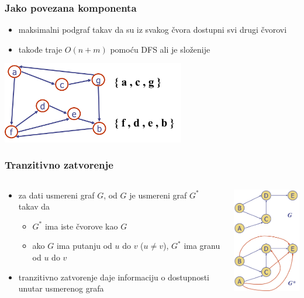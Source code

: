 \documentclass[compress,aspectratio=169]{beamer}
\begin{document}
\begin{frame}[fragile]
  \frametitle{Jako povezana komponenta}
  \begin{itemize}
    \item maksimalni podgraf takav da su iz svakog čvora dostupni svi
      drugi čvorovi
    \item takođe traje $O(n+m)$ pomoću DFS ali je složenije
  \end{itemize}
  \begin{center}
    \includegraphics[width=8cm]{asp-14-pic34.png}
  \end{center}
\end{frame}

\begin{frame}[fragile]
  \frametitle{Tranzitivno zatvorenje}
  \begin{columns}
    \begin{column}[t]{6cm}
      \begin{itemize}
        \item za dati usmereni graf $G$,  
          od $G$ je usmereni graf $G^{*}$ takav da
        \begin{itemize}
          \item $G^{*}$ ima iste čvorove kao $G$
          \item ako $G$ ima putanju od $u$ do $v$ ($u\neq v$), $G^{*}$ 
            ima granu od $u$ do $v$
        \end{itemize}
        \item tranzitivno zatvorenje daje informaciju o dostupnosti
          unutar usmerenog grafa
      \end{itemize}
    \end{column}
    \begin{column}[t]{6cm}
      \begin{center}
        \includegraphics[width=4cm]{asp-14-pic35.png}
      \end{center}
    \end{column}
  \end{columns}
\end{frame}
\end{document}
